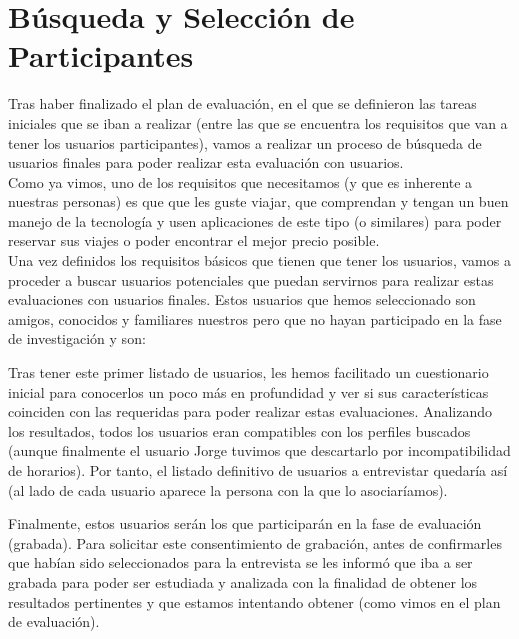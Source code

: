 \section{Búsqueda y Selección de Participantes}
Tras haber finalizado el plan de evaluación, en el que se definieron las tareas iniciales que se iban a realizar (entre las que se
encuentra los requisitos que van a tener los usuarios participantes), vamos a realizar un proceso de búsqueda de usuarios finales 
para poder realizar esta evaluación con usuarios. \\

Como ya vimos, uno de los requisitos que necesitamos (y que es inherente a nuestras personas) es que que les guste viajar, que comprendan
y tengan un buen manejo de la tecnología y usen aplicaciones de este tipo (o similares) para poder reservar sus viajes 
o poder encontrar el mejor precio posible. \\

Una vez definidos los requisitos básicos que tienen que tener los usuarios, vamos a proceder a buscar usuarios potenciales que puedan servirnos
para realizar estas evaluaciones con usuarios finales. Estos usuarios que hemos seleccionado son amigos, conocidos y familiares nuestros pero que no hayan
participado en la fase de investigación y son:

Tras tener este primer listado de usuarios, les hemos facilitado un cuestionario inicial para conocerlos un poco más en profundidad y ver si sus características
coinciden con las requeridas para poder realizar estas evaluaciones. Analizando los resultados, todos los usuarios eran compatibles con los perfiles buscados (aunque
finalmente el usuario Jorge tuvimos que descartarlo por incompatibilidad de horarios). Por tanto, el listado definitivo de usuarios a entrevistar quedaría así (al lado
de cada usuario aparece la persona con la que lo asociaríamos).

Finalmente, estos usuarios serán los que participarán en la fase de evaluación (grabada). Para solicitar este consentimiento de grabación, antes de confirmarles que 
habían sido seleccionados para la entrevista se les informó que iba a ser grabada para poder ser estudiada y analizada con la finalidad de obtener los resultados
pertinentes y que estamos intentando obtener (como vimos en el plan de evaluación).